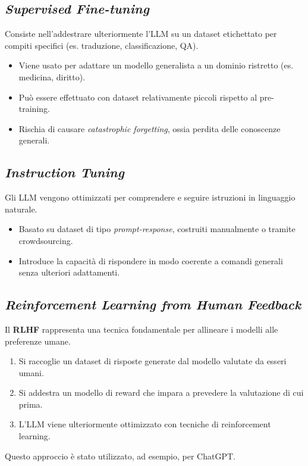 \subsection{\textit{Supervised Fine-tuning}}
Consiste nell'addestrare ulteriormente l'LLM su un dataset etichettato per compiti specifici (es. traduzione, classificazione, QA).
\begin{itemize}
    \item Viene usato per adattare un modello generalista a un dominio ristretto (es. medicina, diritto).
    \item Può essere effettuato con dataset relativamente piccoli rispetto al pre-training.
    \item Rischia di causare \textit{catastrophic forgetting}, ossia perdita delle conoscenze generali.
\end{itemize}

\subsection{\textit{Instruction Tuning}}
Gli LLM vengono ottimizzati per comprendere e seguire istruzioni in linguaggio naturale.
\begin{itemize}
    \item Basato su dataset di tipo \textit{prompt-response}, costruiti manualmente o tramite crowdsourcing.
    \item Introduce la capacità di rispondere in modo coerente a comandi generali senza ulteriori adattamenti.
\end{itemize}
\cite{chung2022scaling}

\subsection{\textit{Reinforcement Learning from Human Feedback}}
Il \textbf{RLHF} \cite{ziegler2019fine} rappresenta una tecnica fondamentale per allineare i modelli alle preferenze umane.
\begin{enumerate}
    \item Si raccoglie un dataset di risposte generate dal modello valutate da esseri umani.
    \item Si addestra un modello di reward che impara a prevedere la valutazione di cui prima.
    \item L'LLM viene ulteriormente ottimizzato con tecniche di reinforcement learning.
\end{enumerate}
Questo approccio è stato utilizzato, ad esempio, per ChatGPT.

